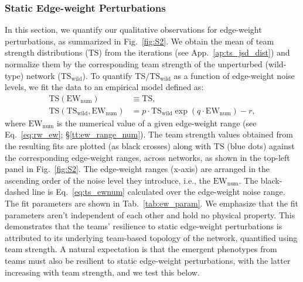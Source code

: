 \documentclass[11pt]{article}
\newcommand{\ts}{\mathrm{TS}}
\newcommand{\tsw}{\mathrm{TS_{wild}}}
\newcommand{\ewnum}{\mathrm{EW_{num}}}
\begin{document}
\subsubsection{Static Edge-weight Perturbations} \label{sssec:stat_ew}
In this section, we quantify our qualitative observations for edge-weight perturbations, as summarized in Fig.~\ref{fig:S2}. We obtain the mean of team strength distributions ($\ts$) from the iterations (see App.~\ref{ap:ts_jsd_dist}) and normalize them by the corresponding team strength of the unperturbed (wild-type) network ($\tsw$). To quantify $\ts/\tsw$ as a function of edge-weight noise levels, we fit the data to an empirical model defined as:
\begin{align}
    \ts(\ewnum) &\equiv \ts, \\
    \ts(\tsw,\ewnum) &= p\cdot\tsw\exp(q\cdot\ewnum) - r, \label{eq:ts_ewnum}
\end{align}
where $\ewnum$ is the numerical value of a given edge-weight range (see Eq.~\ref{eq:rw_ew}; \S\ref{tt:ew_range_num}). The team strength values obtained from the resulting fits are plotted (as black crosses) along with $\ts$ (blue dots) against the corresponding edge-weight ranges, across networks, as shown in the top-left panel in Fig.~\ref{fig:S2}. The edge-weight ranges (x-axis) are arranged in the ascending order of the noise level they introduce, i.e., the $\ewnum$. The black-dashed line is Eq.~\ref{eq:ts_ewnum} calculated over the edge-weight noise range. The fit parameters are shown in Tab.~\ref{tab:ew_param}. We emphasize that the fit parameters aren't independent of each other and hold no physical property. This demonstrates that the teams' resilience to static edge-weight perturbations is attributed to its underlying team-based topology of the network, quantified using team strength. A natural expectation is that the emergent phenotypes from teams must also be resilient to static edge-weight perturbations, with the latter increasing with team strength, and we test this below. 
\end{document}
